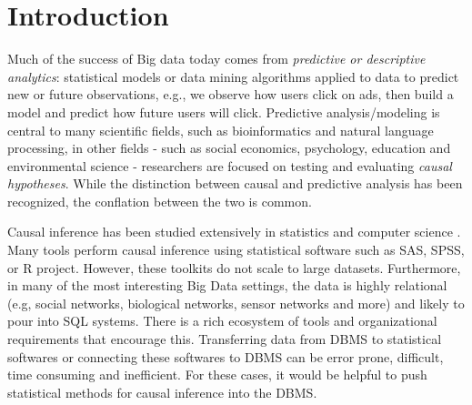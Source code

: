 \section{Introduction}
\label{sec:introduction}





Much of the success of Big data today comes from \emph{predictive or descriptive
  analytics}:  statistical models or data mining algorithms applied to data
to predict new or future observations, e.g., we observe
how users click on ads, then build a model and predict how future
users will click.  Predictive analysis/modeling is central to many scientific fields, such as
bioinformatics and natural language processing, in other  fields - such as social economics, psychology, education and environmental
science - researchers are focused on testing and evaluating {\em causal hypotheses}. While the distinction between causal
and predictive analysis has been recognized, the conflation between the two is common.


Causal inference has been studied extensively in statistics and
computer science \cite{Fisher1935design,Rubin2005,holland1986statistics,PearlBook2000,Spirtes:book01}.
Many tools perform causal inference
 using statistical software such as SAS, SPSS, or R project. However, these toolkits do not scale to large datasets.  Furthermore, in many of the most interesting Big Data settings, the data
is highly relational (e.g, social networks, biological networks, sensor networks and more) and likely to pour into SQL systems. There is a rich ecosystem of tools and organizational requirements that encourage this. Transferring
data from DBMS to statistical softwares or connecting these
softwares to DBMS can be error prone, difficult, time consuming and inefficient. For these
cases, it would be helpful to push statistical methods for causal inference into the DBMS.



